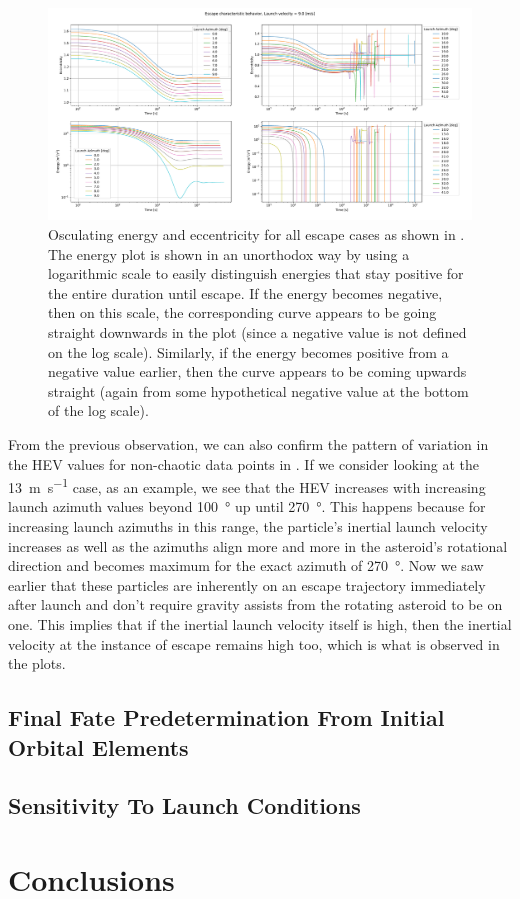 \begin{figure}[htb]
\centering
\captionsetup{justification=centering}
\includegraphics[angle=90, width=\textwidth, height=\textheight, keepaspectratio=true]{Images/longest_edge_no_perturbations/escape_energy_ecc_9ms.pdf}
\caption{Osculating energy and eccentricity for all escape cases as shown in \protect{}. The energy plot is shown in an unorthodox way by using a logarithmic scale to easily distinguish energies that stay positive for the entire duration until escape. If the energy becomes negative, then on this scale, the corresponding curve appears to be going straight downwards in the plot (since a negative value is not defined on the log scale). Similarly, if the energy becomes positive from a negative value earlier, then the curve appears to be coming upwards straight (again from some hypothetical negative value at the bottom of the log scale).}
\label{fig:energy_ecc_escape_9ms_noSP}
\end{figure}
\FloatBarrier
From the previous observation, we can also confirm the pattern of variation in the \gls{HEV} values for non-chaotic data points in . If we consider looking at the \SI{13}{\metre\per\second} case, as an example, we see that the \gls{HEV} increases with increasing launch azimuth values beyond \SI{100}{\degree} up until \SI{270}{\degree}. This happens because for increasing launch azimuths in this range, the particle's inertial launch velocity increases as well as the azimuths align more and more in the asteroid's rotational direction and becomes maximum for the exact azimuth of \SI{270}{\degree}. Now we saw earlier that these particles are inherently on an escape trajectory immediately after launch and don't require gravity assists from the rotating asteroid to be on one. This implies that if the inertial launch velocity itself is high, then the inertial velocity at the instance of escape remains high too, which is what is observed in the plots.

\subsection{Final Fate Predetermination From Initial Orbital Elements}
\label{subsec:final_fate_predetermine_noSP}


\subsection{Sensitivity To Launch Conditions}
\label{subsec:sensitivity_noSP}


\section{Conclusions}
\label{sec:conclusions_noSP}
